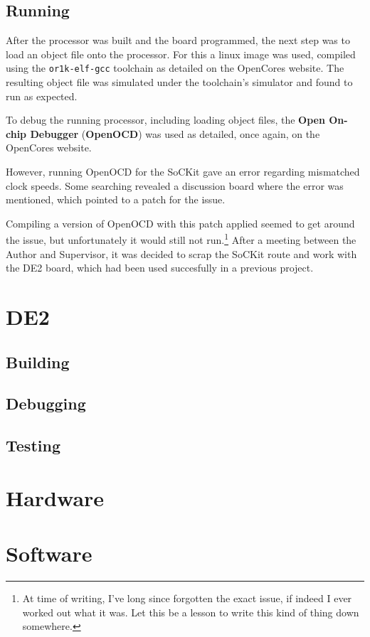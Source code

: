 \subsection{Running}
After the processor was built and the board programmed, the next step was to load an object file onto the processor. For this a linux image was used, compiled using the \verb|or1k-elf-gcc| toolchain as detailed on the OpenCores website\cite{or1k-linux}. The resulting object file was simulated under the toolchain's simulator and found to run as expected.

To debug the running processor, including loading object files, the \textbf{Open On-chip Debugger} (\textbf{OpenOCD}) was used as detailed, once again, on the OpenCores website\cite{or1k-openocd}.

However, running OpenOCD for the SoCKit gave an error regarding mismatched clock speeds. Some searching revealed a discussion board\cite{openocd-sockit} where the error was mentioned, which pointed to a patch for the issue\cite{openocd-fix}.

Compiling a version of OpenOCD with this patch applied seemed to get around the issue, but unfortunately it would still not run.\footnote{At time of writing, I've long since forgotten the exact issue, if indeed I ever worked out what it was. Let this be a lesson to write this kind of thing down somewhere.} After a meeting between the Author and Supervisor, it was decided to scrap the SoCKit route and work with the DE2 board, which had been used succesfully in a previous project.

\section{DE2}
\subsection{Building}
\subsection{Debugging}
\subsection{Testing}
\section{Hardware}
\section{Software}